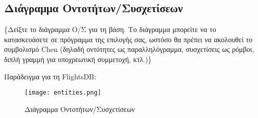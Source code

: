 \subsection{Διάγραμμα Οντοτήτων/Συσχετίσεων}

\{Δείξτε το διάγραμμα Ο/Σ για τη βάση. Το διάγραμμα μπορείτε να το
κατασκευάσετε σε πρόγραμμα της επιλογής σας, ωστόσο θα πρέπει να
ακολουθεί το συμβολισμό Chen (δηλαδή οντότητες ως παραλληλόγραμμα,
συσχετίσεις ως ρόμβοι, διπλή γραμμή για υποχρεωτική συμμετοχή, κτλ.)\}

Παράδειγμα για τη FlightsDB:
\begin{figure}[H]
  \centering
  \texttt{[image: entities.png]}
  \caption{Διάγραμμα Οντοτήτων/Συσχετίσεων}
\end{figure}


